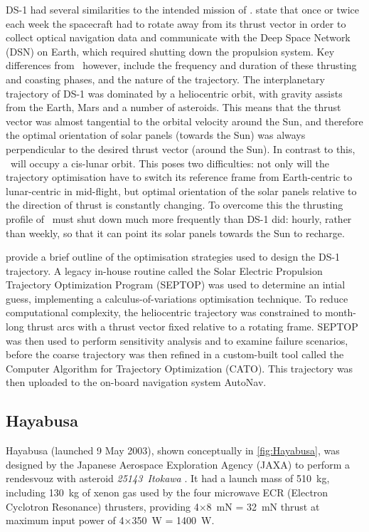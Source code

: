 DS-1 had several similarities to the intended mission of \BW. \textcite{Rayman1997} state that once or twice each week the spacecraft had to rotate away from its thrust vector in order to collect optical navigation data and communicate with the Deep Space Network (DSN) on Earth, which required shutting down the propulsion system. Key differences from \BW\ however, include the frequency and duration of these thrusting and coasting phases, and the nature of the trajectory. The interplanetary trajectory of DS-1 was dominated by a heliocentric orbit, with gravity assists from the Earth, Mars and a number of asteroids. This means that the thrust vector was almost tangential to the orbital velocity around the Sun, and therefore the optimal orientation of solar panels (towards the Sun) was always perpendicular to the desired thrust vector (around the Sun). In contrast to this, \BW\ will occupy a cis-lunar orbit. This poses two difficulties: not only will the trajectory optimisation have to switch its reference frame from Earth-centric to lunar-centric in mid-flight, but optimal orientation of the solar panels relative to the direction of thrust is constantly changing. To overcome this the thrusting profile of \BW\ must shut down much more frequently than DS-1 did: hourly, rather than weekly, so that it can point its solar panels towards the Sun to recharge.

\textcite{Rayman1999} provide a brief outline of the optimisation strategies used to design the DS-1 trajectory. A legacy in-house routine called the Solar Electric Propulsion Trajectory Optimization Program (SEPTOP) was used to determine an intial guess, implementing a calculus-of-variations optimisation technique. To reduce computational complexity, the heliocentric trajectory was constrained to month-long thrust arcs with a thrust vector fixed relative to a rotating frame. 
SEPTOP was then used to perform sensitivity analysis and to examine failure scenarios, before the coarse trajectory was then refined in a custom-built tool called the Computer Algorithm for Trajectory Optimization (CATO). This trajectory was then uploaded to the on-board navigation system AutoNav.

\subsection{Hayabusa}
Hayabusa (launched 9 May 2003), shown conceptually in \autoref{fig:Hayabusa}, was designed by the Japanese Aerospace Exploration Agency (JAXA) to perform a rendesvouz with asteroid \emph{25143~Itokawa} \parencite{web_Hayabusa}. It had a launch mass of 510~kg, including 130~kg of xenon gas used by the four microwave ECR (Electron Cyclotron Resonance) thrusters, providing 4$\times$8~mN = 32~mN thrust at maximum input power of 4$\times$350~W = 1400~W. 

